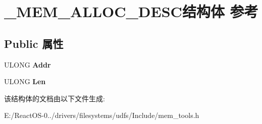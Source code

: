 \hypertarget{struct___m_e_m___a_l_l_o_c___d_e_s_c}{}\section{\+\_\+\+M\+E\+M\+\_\+\+A\+L\+L\+O\+C\+\_\+\+D\+E\+S\+C结构体 参考}
\label{struct___m_e_m___a_l_l_o_c___d_e_s_c}
\subsection*{Public 属性}
\begin{DoxyCompactItemize}
\item 
\mbox{\label{struct___m_e_m___a_l_l_o_c___d_e_s_c_a79bb71b3aaed59674c527e6c11c222b5}} 
U\+L\+O\+NG {\bfseries Addr}
\item 
\mbox{\label{struct___m_e_m___a_l_l_o_c___d_e_s_c_a0d1145dbe1f0f4aae7abb0319f462459}} 
U\+L\+O\+NG {\bfseries Len}
\end{DoxyCompactItemize}


该结构体的文档由以下文件生成\+:\begin{DoxyCompactItemize}
\item 
E\+:/\+React\+O\+S-\/0../drivers/filesystems/udfs/\+Include/mem\+\_\+tools.\+h\end{DoxyCompactItemize}
